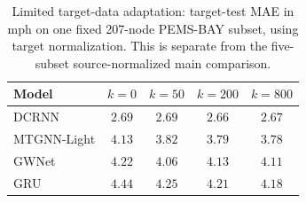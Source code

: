 \begin{table}[h]
\centering\small
\caption{Limited target-data adaptation: target-test MAE in mph on one fixed 207-node PEMS-BAY subset, using target normalization. This is separate from the five-subset source-normalized main comparison.}
\label{tab:fewshot_summary}
\begin{tabular}{lcccc}
\toprule
\textbf{Model} & \textbf{$k=0$} & \textbf{$k=50$} & \textbf{$k=200$} & \textbf{$k=800$} \\
\midrule
DCRNN & $2.69$ & $2.69$ & $2.66$ & $2.67$ \\
MTGNN-Light & $4.13$ & $3.82$ & $3.79$ & $3.78$ \\
GWNet & $4.22$ & $4.06$ & $4.13$ & $4.11$ \\
GRU & $4.44$ & $4.25$ & $4.21$ & $4.18$ \\
\bottomrule
\end{tabular}
\end{table}
